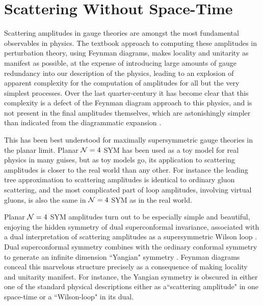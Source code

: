 \documentclass[12pt,nohyper,twosided]{JHEP3}
\title{\hspace{-0.0cm}{\LARGE The Amplituhedron}}
\author{\vspace{-.5cm}Nima Arkani-Hamed$^{a}$ and Jaroslav Trnka$^{b}$\\
{\footnotesize{\it $^{a}$ School of Natural Sciences, Institute for Advanced Study, Princeton, NJ 08540, USA}\\
{\it $^{b}$ California Institute of Technology, Pasadena, CA 91125,
USA}}\vspace{-.5cm}} \preprint{2013}
\begin{document}
\newpage

\section{Scattering Without Space-Time}

Scattering amplitudes in gauge theories are amongst the most
fundamental observables in physics. The textbook approach to
computing these amplitudes in perturbation theory, using Feynman
diagrams, makes locality and unitarity as manifest as possible, at
the expense of introducing large amounts of gauge redundancy into
our description of the physics, leading to an explosion of apparent
complexity for the computation of amplitudes for all but the very
simplest processes. Over the last quarter-century it has become
clear that this complexity is a defect of the Feynman diagram
approach to this physics, and is not present in the final amplitudes
themselves, which are astonishingly simpler than indicated from the
diagrammatic expansion \cite{PT,Z1,Z2,Witten:2003nn, CSW,
BCFW1,BCFW2}.

This has been best understood  for maximally supersymmetric gauge
theories in the planar limit. Planar ${\cal N} = 4$ SYM has been
used as a toy model for real physics in many guises, but as toy
models go, its application to scattering amplitudes is closer to the
real world than any other. For instance the leading tree
approximation to scattering amplitudes is identical to ordinary
gluon scattering, and the most complicated part of loop amplitudes,
involving virtual gluons, is also the same in ${\cal N} = 4$ SYM as
in the real world.

Planar ${\cal N} = 4$ SYM amplitudes turn out to be especially
simple and beautiful, enjoying the hidden symmetry of dual superconformal
invariance\cite{DCI1,DCI2}, associated with a dual interpretation of
scattering amplitudes as a supersymmetric Wilson loop
\cite{WL1,WL2,Alday:2010zy}. Dual superconformal symmetry combines
with the ordinary conformal symmetry to generate an infinite
dimension ``Yangian" symmetry \cite{Yangian}. Feynman diagrams
conceal this marvelous structure precisely as a consequence of
making locality and unitarity manifest. For instance, the Yangian
symmetry is obscured in either one of the standard physical
descriptions either as a``scattering amplitude" in one space-time or
a ``Wilson-loop" in its dual.
\end{document}

